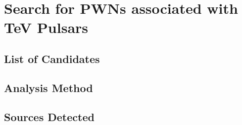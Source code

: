 
\chapter{Search for \acp{PWN} associated with TeV Pulsars}

\section{List of Candidates}

\section{Analysis Method}

\section{Sources Detected}
